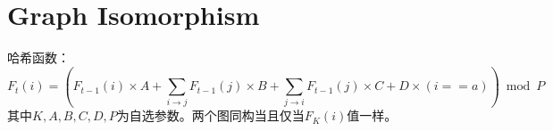 \documentclass[11pt]{article}
\begin{document}
\section{Graph Isomorphism}
哈希函数：
$$F_t(i) = \left(F_{t-1}(i) \times A + \sum_{i \to j}F_{t-1}(j) \times B + \sum_{j \to i}F_{t-1}(j) \times C + D \times (i==a) \right) \bmod P$$
其中$K,A,B,C,D,P$为自选参数。两个图同构当且仅当$F_K(i)$值一样。
\end{document}

